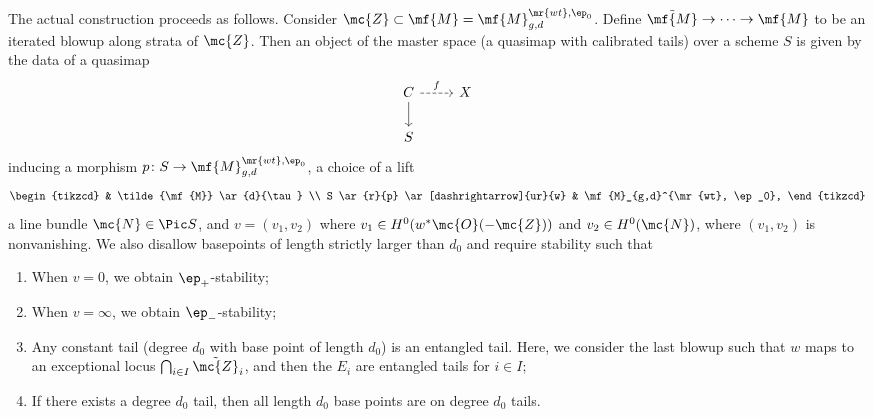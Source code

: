 The actual construction proceeds as follows. Consider \(\mc{Z} \subset \mf{M} = \mf{M}_{g,d}^{\mr{wt}, \ep_0}\). Define \(\tilde{\mf{M}} \to \cdots \to \mf{M}\) to be an iterated blowup along strata of \(\mc{Z}\). Then an object of the master space (a quasimap with calibrated tails) over a scheme \(S\) is given by the data of a quasimap
\begin{equation*}
\begin{tikzcd}
    C \ar{d} \ar[dashrightarrow]{r}{f} & X \\
    S
\end{tikzcd}
\end{equation*}
inducing a morphism \(p \colon S \to \mf{M}_{g,d}^{\mr{wt}, \ep_0}\), a choice of a lift
\begin{equation*}
\begin{tikzcd}
    & \tilde{\mf{M}} \ar{d}{\tau} \\
    S \ar{r}{p} \ar[dashrightarrow]{ur}{w} & \mf{M}_{g,d}^{\mr{wt}, \ep_0},
\end{tikzcd}
\end{equation*}
a line bundle \(\mc{N} \in \Pic S\), and \(v = (v_1, v_2)\) where \(v_1 \in H^0(w^* \mc{O}(-\mc{Z}))\) and \(v_2 \in H^0(\mc{N})\), where \((v_1, v_2)\) is nonvanishing. We also disallow basepoints of length strictly larger than \(d_0\) and require stability such that
\begin{enumerate}
    \item When \(v = 0\), we obtain \(\ep_+\)-stability;
    \item When \(v = \infty\), we obtain \(\ep_-\)-stability;
    \item Any constant tail (degree \(d_0\) with base point of length \(d_0\)) is an entangled tail. Here, we consider the last blowup such that \(w\) maps to an exceptional locus \(\bigcap_{i \in I} \tilde{\mc{Z}}_i\), and then the \(E_i\) are entangled tails for \(i \in I\);
    \item If there exists a degree \(d_0\) tail, then all length \(d_0\) base points are on degree \(d_0\) tails.
\end{enumerate}







